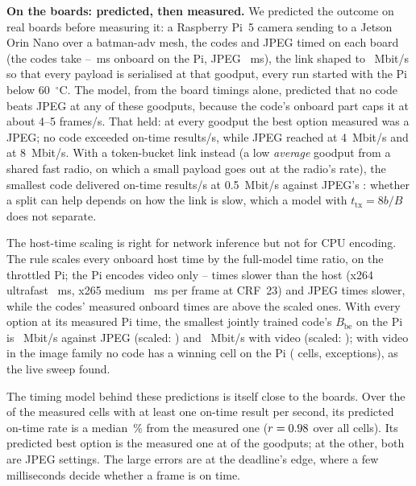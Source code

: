 \textbf{On the boards: predicted, then measured.}\label{sec:board-be} We predicted the outcome on real boards before
measuring it: a Raspberry Pi~5 camera sending to a Jetson Orin Nano over a batman-adv mesh, the codes and JPEG timed
on each board (the codes take \BpCodeMsMin--\BpCodeMsMax~ms onboard on the Pi, JPEG \BpJpegOnb~ms), the link shaped
to \BpRates~Mbit/s so that every payload is serialised at that goodput, every run started with the Pi below
60~$^\circ$C. The model, from the board timings alone, predicted that no code beats JPEG at any of these goodputs,
because the code's onboard part caps it at about 4--5 frames/s. That held: at every goodput the best option measured
was a JPEG; no code exceeded \BpCodeFpsMax{} on-time results/s, while JPEG reached \BpJpegFpsFour{} at 4~Mbit/s and
\BpJpegFpsEight{} at 8~Mbit/s. With a token-bucket link instead (a low \emph{average} goodput from a shared fast radio,
on which a small payload goes out at the radio's rate), the smallest code delivered \BpHtbCode{} on-time results/s at
0.5~Mbit/s against JPEG's \BpHtbJpeg: whether a split can help depends on how the link is slow, which a model with
$t_{\mathrm{tx}} = 8b/B$ does not separate.

The host-time scaling is right for network inference but not for CPU encoding. The rule scales every onboard host
time by the full-model time ratio, \BpScale{} on the throttled Pi; the Pi encodes video only \BpRatioMin--\BpRatioMax{}
times slower than the host (x264 ultrafast \BpXuf~ms, x265 medium \BpXmed~ms per frame at CRF~23) and JPEG \BpJpegRatio{}
times slower, while the codes' measured onboard times are above the scaled ones. With every option at its measured Pi
time, the smallest jointly trained code's $B_{\mathrm{be}}$ on the Pi is \BpHeadJpegMeas~Mbit/s against JPEG (scaled:
\BpHeadJpegRule) and \BpHeadVideoMeas~Mbit/s with video (scaled: \BpHeadVideoRule); with video in the image family no
code has a winning cell on the Pi (\BpWinsVideoMeas{} cells, \BpExc{} exceptions), as the live sweep found.

The timing model behind these predictions is itself close to the boards. Over the \BpModelCellsBig{} of the
\BpModelCells{} measured cells with at least one on-time result per second, its predicted on-time rate is a median
\BpModelErrPct\,\% from the measured one ($r = 0.98$ over all cells). Its predicted best option is the measured one
at \BpModelBestMatch{} of the \BpModelRates{} goodputs; at the other, both are JPEG settings. The large errors are at
the deadline's edge, where a few milliseconds decide whether a frame is on time.

